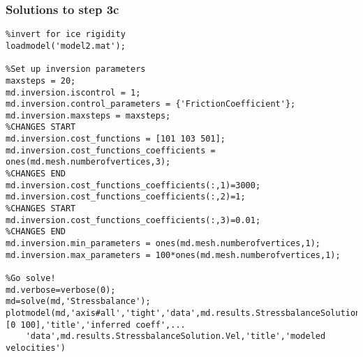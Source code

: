 \subsubsection{Solutions to step 3c}
\begin{verbatim}%invert for ice rigidity
loadmodel('model2.mat');

%Set up inversion parameters
maxsteps = 20;
md.inversion.iscontrol = 1;
md.inversion.control_parameters = {'FrictionCoefficient'};
md.inversion.maxsteps = maxsteps;
%CHANGES START
md.inversion.cost_functions = [101 103 501];
md.inversion.cost_functions_coefficients = ones(md.mesh.numberofvertices,3);
%CHANGES END
md.inversion.cost_functions_coefficients(:,1)=3000;
md.inversion.cost_functions_coefficients(:,2)=1;
%CHANGES START
md.inversion.cost_functions_coefficients(:,3)=0.01;
%CHANGES END
md.inversion.min_parameters = ones(md.mesh.numberofvertices,1);
md.inversion.max_parameters = 100*ones(md.mesh.numberofvertices,1);

%Go solve!
md.verbose=verbose(0);
md=solve(md,'Stressbalance');
plotmodel(md,'axis#all','tight','data',md.results.StressbalanceSolution.FrictionCoefficient,'caxis',[0 100],'title','inferred coeff',...
	'data',md.results.StressbalanceSolution.Vel,'title','modeled velocities')
\end{verbatim}
